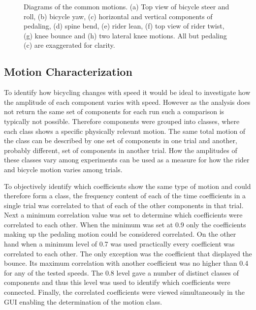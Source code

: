 \documentclass[smallextended]{svjour3}     %
\begin{document}
\begin{figure}[tbp]
    \begin{center}
        \qquad
        \qquad
        \qquad

        \qquad
        \qquad
        \qquad
    \end{center}
    \caption{Diagrams of the common motions. (a) Top view of bicycle steer
    and roll, (b) bicycle yaw, (c) horizontal and vertical components
    of pedaling, (d) spine bend, (e) rider lean, (f) top view of rider
    twist, (g) knee bounce and (h) two lateral knee motions. All but pedaling (c) are
    exaggerated for clarity.}
    \label{fig:motions}
\end{figure}

\subsection{Motion Characterization}
\label{sec:motionChar}
To identify how bicycling changes with speed it would be ideal to investigate
how the amplitude of each component varies with speed. However as the analysis
does not return the same set of components for each run such a comparison is
typically not possible. Therefore components were grouped into classes, where
each class shows a specific physically relevant motion. The same total motion
of the class can be described by one set of components in one trial and
another, probably different, set of components in another trial. How the
amplitudes of these classes vary among experiments can be used as a
measure for how the rider and bicycle motion varies among trials.

To objectively identify which coefficients show the same type of motion and
could therefore form a class, the frequency content of each of the time
coefficients in a single trial was correlated to that of each of the other
components in that trial. Next a minimum correlation value was set to determine
which coefficients were correlated to each other. When the minimum was set at
0.9 only the coefficients making up the pedaling motion could be considered
correlated. On the other hand when a minimum level of 0.7 was used practically
every coefficient was correlated to each other. The only exception was the
coefficient that displayed the bounce. Its maximum correlation with another
coefficient was no higher than 0.4 for any of the tested speeds. The 0.8 level
gave a number of distinct classes of components and thus this level was used to
identify which coefficients were connected. Finally, the correlated
coefficients were viewed simultaneously in the GUI enabling the determination
of the motion class.
\end{document}
